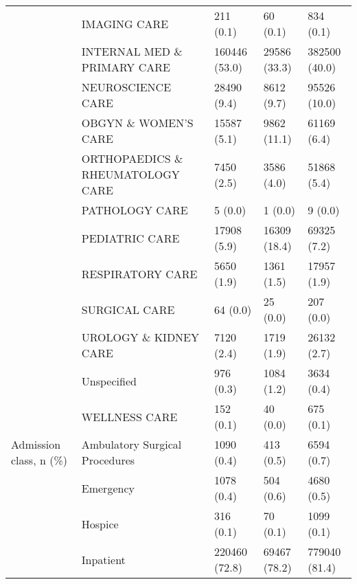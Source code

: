 \begin{tabular}{lllll}
                                       & IMAGING CARE &                 211 (0.1) &           60 (0.1) &          834 (0.1) \\
                                       & INTERNAL MED \& PRIMARY CARE &             160446 (53.0) &       29586 (33.3) &      382500 (40.0) \\
                                       & NEUROSCIENCE CARE &               28490 (9.4) &         8612 (9.7) &       95526 (10.0) \\
                                       & OBGYN \& WOMEN'S CARE &               15587 (5.1) &        9862 (11.1) &        61169 (6.4) \\
                                       & ORTHOPAEDICS \& RHEUMATOLOGY CARE &                7450 (2.5) &         3586 (4.0) &        51868 (5.4) \\
                                       & PATHOLOGY CARE &                   5 (0.0) &            1 (0.0) &            9 (0.0) \\
                                       & PEDIATRIC CARE &               17908 (5.9) &       16309 (18.4) &        69325 (7.2) \\
                                       & RESPIRATORY CARE &                5650 (1.9) &         1361 (1.5) &        17957 (1.9) \\
                                       & SURGICAL CARE &                  64 (0.0) &           25 (0.0) &          207 (0.0) \\
                                       & UROLOGY \& KIDNEY CARE &                7120 (2.4) &         1719 (1.9) &        26132 (2.7) \\
                                       & Unspecified &                 976 (0.3) &         1084 (1.2) &         3634 (0.4) \\
                                       & WELLNESS CARE &                 152 (0.1) &           40 (0.0) &          675 (0.1) \\
Admission class, n (\%) & Ambulatory Surgical Procedures &                1090 (0.4) &          413 (0.5) &         6594 (0.7) \\
                                       & Emergency &                1078 (0.4) &          504 (0.6) &         4680 (0.5) \\
                                       & Hospice &                 316 (0.1) &           70 (0.1) &         1099 (0.1) \\
                                       & Inpatient &             220460 (72.8) &       69467 (78.2) &      779040 (81.4) \\

\end{tabular}
